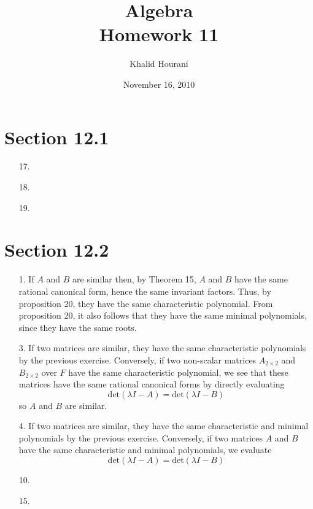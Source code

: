 \documentclass[12pt,leqno]{book}
\title{Algebra\\\large Homework 11}
\date{November 16, 2010}
\author{Khalid Hourani}
\theoremstyle{definition}
\begin{document}
\begin{titlepage}
 \maketitle\thispagestyle{empty}
\end{titlepage}
\thispagestyle{empty}
\clearpage\mbox{}\clearpage

\setcounter{page}{1}
\section*{Section 12.1}
\begin{enumerate}
 \item [17.] 
 \item [18.]
 \item [19.] 
\end{enumerate}

\section*{Section 12.2}
\begin{enumerate}
 \item [1.] If $A$ and $B$ are similar then, by Theorem 15, $A$ and $B$ have the same rational canonical form, hence the same invariant factors. Thus, by proposition 20, they have the same characteristic polynomial. From proposition 20, it also follows that they have the same minimal polynomials, since they have the same roots. 
 \item [3.] If two matrices are similar, they have the same characteristic polynomials by the previous exercise. Conversely, if two non-scalar matrices $A_{2\times2}$ and $B_{2\times2}$ over $F$ have the same characteristic polynomial, we see that these matrices have the same rational canonical forms by directly evaluating \[\text{det}(\lambda I-A)=\text{det}(\lambda I-B)\] so $A$ and $B$ are similar.
 \item [4.] If two matrices are similar, they have the same characteristic and minimal polynomials by the previous exercise. Conversely, if two matrices $A$ and $B$ have the same characteristic and minimal polynomials, we evaluate \[\text{det}(\lambda I-A)=\text{det}(\lambda I-B)\]
 \item [10.] 
 \item [15.] 
\end{enumerate}
\end{document}
